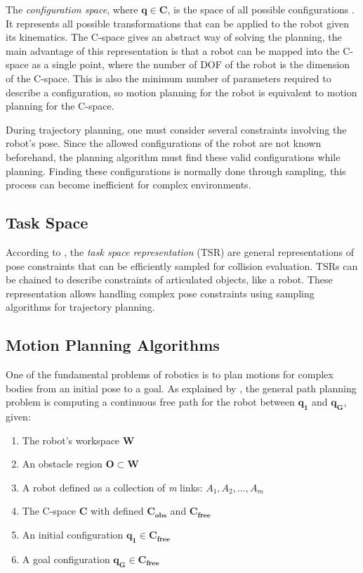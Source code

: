 The \textit{configuration space}, where \( \bm{q} \in  \bm{C} \), is the space of all possible configurations \citep{Handbook}. It represents all possible transformations that can be applied to the robot given its kinematics. The C-space gives an abstract way of solving the planning, the main advantage of this representation is that a robot can be mapped into the C-space as a single point, where the number of DOF of the robot is the dimension of the C-space. This is also the minimum number of parameters required to describe a configuration, so motion planning for the robot is equivalent to motion planning for the C-space.

During trajectory planning, one must consider several constraints involving the robot's pose. Since the allowed configurations of the robot are not known beforehand, the planning algorithm must find these valid configurations while planning. Finding these configurations is normally done through sampling, this process can become inefficient for complex environments.

\subsection{Task Space}

According to \citet{Taskspace}, the \textit{task space representation} (TSR) are general representations of pose constraints that can be efficiently sampled for collision evaluation. TSRs can be chained to describe constraints of articulated objects, like a robot. These representation allows handling complex pose constraints using sampling algorithms for trajectory planning. 

\subsection{Motion Planning Algorithms}

One of the fundamental problems of robotics is to plan motions for complex bodies from an initial pose to a goal. As explained by \citet{Handbook}, the general path planning problem is computing a continuous free path for the robot between $\bm{q_{1}}$ and $\bm{q_{G}}$, given:
\begin{enumerate}
	\vspace{-5pt}
	\item The robot's workspace $\bm{W}$
	\vspace{-5pt}
	\item An obstacle region $\bm{O} \subset \bm{W}$
	\vspace{-5pt}
	\item A robot defined as a collection of \textit{m} links: $A_{1}, A_{2}, ... , A_{m}$
	\vspace{-5pt}
	\item The C-space $\bm{C}$ with defined $\bm{C_{obs}}$ and $\bm{C_{free}}$
	\vspace{-5pt} 
	\item An initial configuration $\bm{q_{1}} \in  \bm{C_{free}}$
	\vspace{-5pt} 
	\item A goal configuration $\bm{q_{G}} \in  \bm{C_{free}}$
\end{enumerate}

